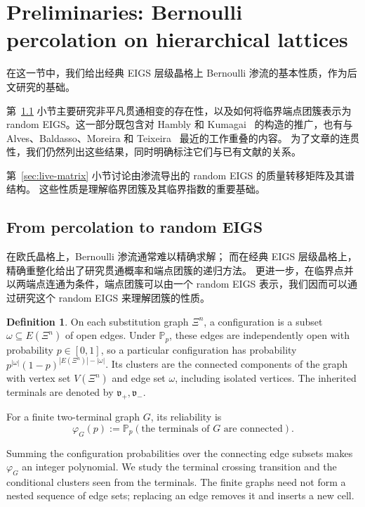 \documentclass[scheme=plain,11pt]{ctexart}
\theoremstyle{definition}
\newtheorem{definition}[theorem]{Definition}
\theoremstyle{remark}
\begin{document}
\section{Preliminaries: Bernoulli percolation on hierarchical lattices}\label{sec:bernoulli}

在这一节中，我们给出经典 EIGS 层级晶格上 Bernoulli 渗流的基本性质，作为后文研究的基础。

第~\ref{sec:percolation-preliminaries} 小节主要研究非平凡贯通相变的存在性，以及如何将临界端点团簇表示为 random EIGS。这一部分既包含对 Hambly 和 Kumagai~\cite{hambly2010diffusion} 的构造的推广，也有与 Alves、Baldasso、Moreira 和 Teixeira~\cite{alves2026percolation} 最近的工作重叠的内容。
为了文章的连贯性，我们仍然列出这些结果，同时明确标注它们与已有文献的关系。

第~\ref{sec:live-matrix} 小节讨论由渗流导出的 random EIGS 的质量转移矩阵及其谱结构。
这些性质是理解临界团簇及其临界指数的重要基础。


\subsection{From percolation to random EIGS}\label{sec:percolation-preliminaries}

在欧氏晶格上，Bernoulli 渗流通常难以精确求解；
而在经典 EIGS 层级晶格上，精确重整化给出了研究贯通概率和端点团簇的递归方法。
更进一步，在临界点并以两端点连通为条件，端点团簇可以由一个 random EIGS 表示，我们因而可以通过研究这个 random EIGS 来理解团簇的性质。

\begin{definition}\label{def:bernoulli}
On each substitution graph $\Xi^n$, a configuration is a subset $\omega\subseteq E(\Xi^n)$ of open edges. Under $\mathbb P_p$, these edges are independently open with probability $p\in[0,1]$, so a particular configuration has probability $p^{|\omega|}(1-p)^{|E(\Xi^n)|-|\omega|}$. Its clusters are the connected components of the graph with vertex set $V(\Xi^n)$ and edge set $\omega$, including isolated vertices. The inherited terminals are denoted by $\mathfrak v_+,\mathfrak v_-$.

For a finite two-terminal graph $G$, its reliability is
\[
 \varphi_G(p):=\mathbb P_p(\text{the terminals of }G\text{ are connected}).
\]
\end{definition}
Summing the configuration probabilities over the connecting edge subsets makes $\varphi_G$ an integer polynomial. We study the terminal crossing transition and the conditional clusters seen from the terminals. The finite graphs need not form a nested sequence of edge sets; replacing an edge removes it and inserts a new cell.
\end{document}
